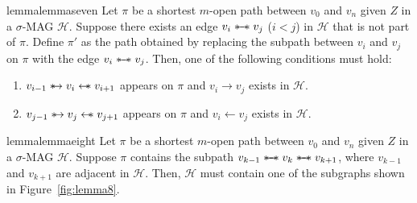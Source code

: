 \documentclass[accepted]{uai2025} %
\newcommand{\hus}{\mathrel{{\leftarrow\mkern-11mu\ast}}}
\newcommand{\suh}{\mathrel{{\ast\mkern-11mu\to}}}
\newcommand{\sus}{\mathrel{{\ast\mkern-11mu\relbar\mkern-9mu\relbar\mkern-11mu\ast}}}
\begin{document}
\begin{restatable}{lemma}{lemmaseven} \label{lemma7}
Let $\pi$ be a shortest $m$-open path between \( v_0 \) and \( v_n \) given \( Z \) in a \( \sigma \)-MAG \( \mathcal{H} \). Suppose there exists an edge \( v_i \sus  v_j \) ($i<j$) in \( \mathcal{H} \) that is not part of \( \pi \). Define \( \pi' \) as the path obtained by replacing the subpath between \( v_i \) and \( v_j \) on \( \pi \) with the edge \( v_i \sus  v_j \). Then, one of the following conditions must hold:
\begin{enumerate}
    \item \( v_{i-1}\suh v_i \hus  v_{i+1} \) appears on \( \pi \) and \( v_i \rightarrow v_j \) exists in \( \mathcal{H} \).
    \item \( v_{j-1} \suh v_j\hus v_{j+1}\) appears on \( \pi \) and \( v_i \leftarrow v_j \) exists in \( \mathcal{H} \).
\end{enumerate}
\end{restatable}

\begin{restatable}{lemma}{lemmaeight} \label{lemma8}
Let \( \pi \) be a shortest $m$-open path between \( v_0 \) and \( v_n \) given \( Z \) in a \( \sigma \)-MAG \( \mathcal{H} \). Suppose \( \pi \) contains the subpath \( v_{k-1} \sus  v_k \sus  v_{k+1} \), where \( v_{k-1} \) and \( v_{k+1} \) are adjacent in \( \mathcal{H} \). Then, \( \mathcal{H} \) must contain one of the subgraphs shown in Figure~\ref{fig:lemma8}.
\end{restatable}
\end{document}
